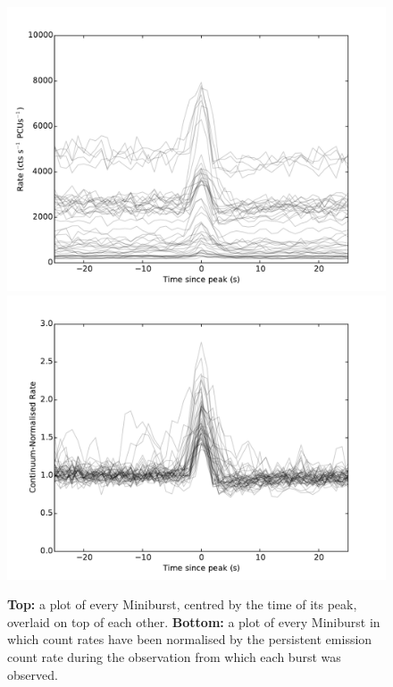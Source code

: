 \begin{figure}
  \centering
  \includegraphics[width=.9\linewidth, trim={0.4cm 0 1.1cm 0},clip]{images/1000mini.pdf}
  \includegraphics[width=.9\linewidth, trim={0.4cm 0 1.1cm 0},clip]{images/1000mini_renormed.pdf}
  \caption[A plot of every Miniburst, centred by the time of its peak, overlaid on top of each other.]{\small  \textbf{Top:} a plot of every Miniburst, centred by the time of its peak, overlaid on top of each other.  \textbf{Bottom:} a plot of every Miniburst in which count rates have been normalised by the persistent emission count rate during the observation from which each burst was observed.}
  \label{fig:mini_over}
\end{figure}


